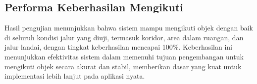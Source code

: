 \subsection{Performa Keberhasilan Mengikuti}
\label{sec:keberhasilanmengikuti}

Hasil pengujian menunjukkan bahwa sistem mampu mengikuti objek dengan baik di seluruh kondisi jalur yang diuji, termasuk koridor, area dalam ruangan, dan jalur landai, dengan tingkat keberhasilan mencapai 100\%. Keberhasilan ini menunjukkan efektivitas sistem dalam memenuhi tujuan pengembangan untuk mengikuti objek secara akurat dan stabil, memberikan dasar yang kuat untuk implementasi lebih lanjut pada aplikasi nyata.